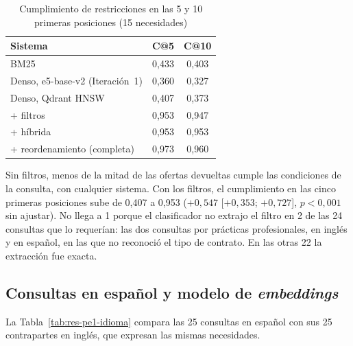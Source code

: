 \begin{table}[htbp!]
    \centering
    \caption{Cumplimiento de restricciones en las 5 y 10 primeras posiciones (15 necesidades)}
    \label{tab:res-restricciones}
    \begin{tabular}{|l|c|c|}
        \hline
        \textbf{Sistema} & \textbf{C@5} & \textbf{C@10} \\
        \hline
        BM25 & 0{,}433 & 0{,}403 \\
        \hline
        Denso, e5-base-v2 (Iteración~1) & 0{,}360 & 0{,}327 \\
        \hline
        Denso, Qdrant HNSW & 0{,}407 & 0{,}373 \\
        \hline
        + filtros & 0{,}953 & 0{,}947 \\
        \hline
        + híbrida & 0{,}953 & 0{,}953 \\
        \hline
        + reordenamiento (completa) & 0{,}973 & 0{,}960 \\
        \hline
    \end{tabular}
\end{table}

Sin filtros, menos de la mitad de las ofertas devueltas cumple las condiciones de la consulta, con cualquier sistema. Con los filtros, el cumplimiento en las cinco primeras posiciones sube de 0,407 a 0,953 ($+0{,}547$ [$+0{,}353$; $+0{,}727$], $p < 0{,}001$ sin ajustar). No llega a 1 porque el clasificador no extrajo el filtro en 2 de las 24 consultas que lo requerían: las dos consultas por prácticas profesionales, en inglés y en español, en las que no reconoció el tipo de contrato. En las otras 22 la extracción fue exacta.

\subsection{Consultas en español y modelo de \textit{embeddings}}

La Tabla~\ref{tab:res-pe1-idioma} compara las 25 consultas en español con sus 25 contrapartes en inglés, que expresan las mismas necesidades.

